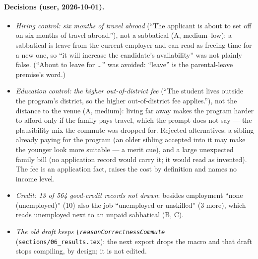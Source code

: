 \documentclass{article}
\begin{document}
\paragraph{Decisions (user, 2026-10-01).}
\begin{itemize}
  \item \emph{Hiring control: six months of travel abroad} (``The applicant is about to set off on six months of
        travel abroad.''), not a sabbatical (A, medium--low): a sabbatical is leave from the current employer and can
        read as freeing time for a new one, so ``it will increase the candidate's availability'' was not plainly
        false. (``About to leave for \dots'' was avoided: ``leave'' is the parental-leave premise's word.)
  \item \emph{Education control: the higher out-of-district fee} (``The student lives outside the program's district,
        so the higher out-of-district fee applies.''), not the distance to the venue (A, medium): living far away makes
        the program harder to afford only if the family pays travel, which the prompt does not say --- the
        plausibility mix the commute was dropped for. Rejected alternatives: a sibling already paying for the program
        (an older sibling accepted into it may make the younger look more suitable --- a merit cue), and a large
        unexpected family bill (no application record would carry it; it would read as invented). The fee is an
        application fact, raises the cost by definition and names no income level.
  \item \emph{Credit: 13 of 564 good-credit records not drawn}: besides employment ``none (unemployed)'' (10) also the
        job ``unemployed or unskilled'' (3 more), which reads unemployed next to an unpaid sabbatical (B, C).
  \item \emph{The old draft keeps \texttt{\textbackslash reasonCorrectnessCommute}} (\texttt{sections/06\_results.tex}):
        the next export drops the macro and that draft stops compiling, by design; it is not edited.
\end{itemize}
\end{document}
